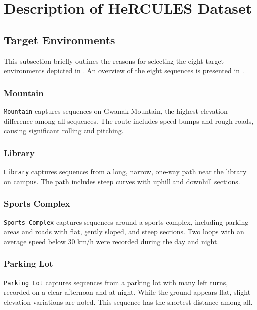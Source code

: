 

\section{Description of HeRCULES Dataset}
\label{sec:experiment}

\subsection{Target Environments}
This subsection briefly outlines the reasons for selecting the eight target environments depicted in . An overview of the eight sequences is presented in .

\subsubsection{Mountain}
\texttt{Mountain} captures sequences on Gwanak Mountain, the highest elevation difference among all sequences. The route includes speed bumps and rough roads, causing significant rolling and pitching.


\subsubsection{Library}
\texttt{Library} captures sequences from a long, narrow, one-way path near the library on campus. The path includes steep curves with uphill and downhill sections.
\subsubsection{Sports Complex}
\texttt{Sports Complex} captures sequences around a sports complex, including parking areas and roads with flat, gently sloped, and steep sections. Two loops with an average speed below 30 km/h were recorded during the day and night.
\subsubsection{Parking Lot}
\texttt{Parking Lot} captures sequences from a parking lot with many left turns, recorded on a clear afternoon and at night. While the ground appears flat, slight elevation variations are noted. This sequence has the shortest distance among all.
